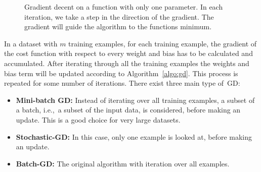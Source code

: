 \begin{figure}
\centering 
\resizebox{0.65\textwidth}{0.4\textwidth}{      

}
\caption{Gradient decent on a function with only one parameter.
%
In each iteration, we take a step in the direction of the gradient. The gradient will guide the algorithm to the functions minimum.
}
\label{fig:gradientD}
\end{figure}
\noindent
In a dataset with $m$ training examples, for each training example, the gradient of the cost function with respect to every weight and bias has to be calculated and accumulated.
%
After iterating through all the training examples the weights and bias term will be updated according to Algorithm~\ref{algo:gd}. This process is repeated for some number of iterations. There exist three main type of~GD: 
\begin{itemize}
\item \textbf{Mini-batch GD:} Instead of iterating over all training examples, a subset of a batch, i.e.,\ a subset of the input data, is considered, before making an update. This is a good choice for very large datasets.
\item \textbf{Stochastic-GD:} In this case, only one example is looked at, before making an update. 
\item \textbf{Batch-GD:} The original algorithm with iteration over all examples. 
\end{itemize}

